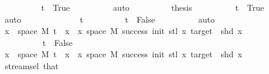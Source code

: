 \begin{isabellebody}
\ \ \ \ \ \ \ \ \isamarkupfalse%
\ {\isacartoucheopen}t\ {\isacharequal}{\kern0pt}\ True{\isacartoucheclose}\isanewline
\ \ \ \ \ \ \ \ \isamarkupfalse%
\ auto\isanewline
\ \ \ \ \ \ \isamarkupfalse%
\ \isamarkupfalse%
\ {\isacharquery}{\kern0pt}thesis\isanewline
\ \ \ \ \ \ \ \ \isamarkupfalse%
\ {\isacartoucheopen}t\ {\isacharequal}{\kern0pt}\ True{\isacartoucheclose}\isanewline
\ \ \ \ \ \ \ \ \isamarkupfalse%
\ auto\isanewline
\ \ \ \ \isamarkupfalse%
\isanewline
\ \ \ \ \ \ \isamarkupfalse%
\ {\isachardoublequoteopen}{\isasymnot}\ t{\isachardoublequoteclose}\isanewline
\ \ \ \ \ \ \isamarkupfalse%
\ \isamarkupfalse%
\ {\isachardoublequoteopen}t\ {\isacharequal}{\kern0pt}\ False{\isachardoublequoteclose}\isanewline
\ \ \ \ \ \ \ \ \isamarkupfalse%
\ auto\isanewline
\ \ \ \ \ \ \isamarkupfalse%
\ \isamarkupfalse%
\ {\isachardoublequoteopen}{\isacharbraceleft}{\kern0pt}x\ {\isasymin}\ space\ M{\isachardot}{\kern0pt}\ t\ {\isacharhash}{\kern0pt}{\isacharhash}{\kern0pt}\ x\ {\isasymin}\ {\isacharbraceleft}{\kern0pt}x{\isasymin}\ space\ M{\isachardot}{\kern0pt}\ success\ {\isacharparenleft}{\kern0pt}init{\isacharplus}{\kern0pt}{}{\isacharparenright}{\kern0pt}\ {\isacharparenleft}{\kern0pt}stl\ x{\isacharparenright}{\kern0pt}\ target\ {\isasymand}\ shd\ x{\isacharbraceright}{\kern0pt}{\isacharbraceright}{\kern0pt}\ {\isacharequal}{\kern0pt}\ {\isacharbraceleft}{\kern0pt}{\isacharbraceright}{\kern0pt}{\isachardoublequoteclose}\isanewline
\ \ \ \ \ \ \ \ \ \ {\isachardoublequoteopen}t\ {\isacharequal}{\kern0pt}\ False{\isachardoublequoteclose}\isanewline
\ \ \ \ \ \ \isamarkupfalse%
{\isacharminus}{\kern0pt}\isanewline
\ \ \ \ \ \ \ \ \isamarkupfalse%
\ {\isachardoublequoteopen}{\isasymforall}x\ {\isasymin}\ space\ M{\isachardot}{\kern0pt}\ t\ {\isacharhash}{\kern0pt}{\isacharhash}{\kern0pt}\ x\ {\isasymnotin}\ {\isacharbraceleft}{\kern0pt}x{\isasymin}\ space\ M{\isachardot}{\kern0pt}\ success\ {\isacharparenleft}{\kern0pt}init{\isacharplus}{\kern0pt}{}{\isacharparenright}{\kern0pt}\ {\isacharparenleft}{\kern0pt}stl\ x{\isacharparenright}{\kern0pt}\ target\ {\isasymand}\ shd\ x{\isacharbraceright}{\kern0pt}{\isachardoublequoteclose}\isanewline
\ \ \ \ \ \ \ \ \ \ \isamarkupfalse%
\ stream{\isachardot}{\kern0pt}sel{\isacharparenleft}{\kern0pt}{}{\isacharparenright}{\kern0pt}\ that\isanewline

\end{isabellebody}
